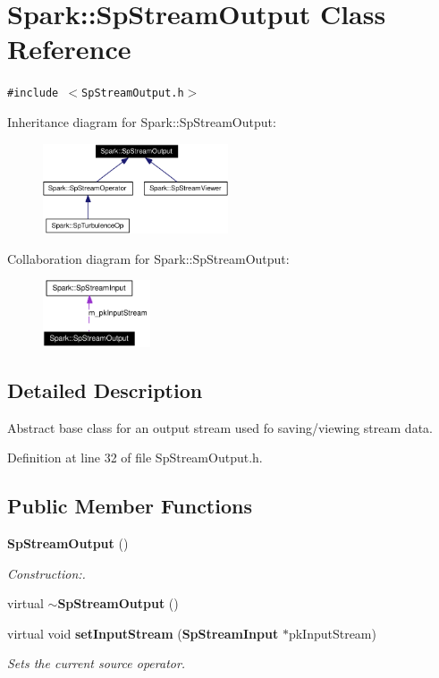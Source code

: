 \section{Spark::Sp\-Stream\-Output Class Reference}
\label{classSpark_1_1SpStreamOutput}
{\tt \#include $<$Sp\-Stream\-Output.h$>$}

Inheritance diagram for Spark::Sp\-Stream\-Output:\begin{figure}[H]
\begin{center}
\leavevmode
\includegraphics[width=155pt]{classSpark_1_1SpStreamOutput__inherit__graph}
\end{center}
\end{figure}
Collaboration diagram for Spark::Sp\-Stream\-Output:\begin{figure}[H]
\begin{center}
\leavevmode
\includegraphics[width=90pt]{classSpark_1_1SpStreamOutput__coll__graph}
\end{center}
\end{figure}


\subsection{Detailed Description}
Abstract base class for an output stream used fo saving/viewing stream data. 

Definition at line 32 of file Sp\-Stream\-Output.h.\subsection*{Public Member Functions}
\begin{CompactItemize}
\item 
{\bf Sp\-Stream\-Output} ()
\begin{CompactList}\small\item\em Construction:. \item\end{CompactList}\item 
virtual {\bf $\sim$Sp\-Stream\-Output} ()
\item 
virtual void {\bf set\-Input\-Stream} ({\bf Sp\-Stream\-Input} $\ast$pk\-Input\-Stream)
\begin{CompactList}\small\item\em Sets the current source operator. \item\end{CompactList}\end{CompactItemize}

